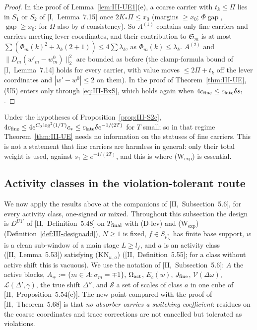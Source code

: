 \documentclass[10pt]{amsart}
\theoremstyle{definition}
\theoremstyle{remark}
\newcommand{\gap}{\operatorname{gap}}
\begin{document}
\begin{proof}
In the proof of Lemma~\ref{lem:III-UE1}(e), a coarse carrier with $t_k\le\Pi$ lies
in $S_1$ or $S_2$ of [I,~Lemma~7.15] once $2K_*\Pi\le x_0$ (margins $\ge x_0$;
$\Phi\gap$, $\gap\ge x_0$; for $\Omega$ also by $d$-consistency).  So
$A^{(1)}$ contains only fine carriers and carriers meeting lever coordinates, and
their contribution to $\mathfrak S_m$ is at most $\sum(\Phi_m(k)^2+\lambda_k(2+1))
\le4\sum\lambda_k$, as $\Phi_m(k)\le\lambda_k$.  $A^{(2)}$ and
$\|D_m(w'_m-w^0_m)\|_2^2$ are bounded as before (the clamp-formula bound of
[I,~Lemma~7.14] holds for every carrier, with value moves $\le2\Pi+t_k$ off the
lever coordinates and $|w'-w^0|\le2$ on them).  In the proof of
Theorem~\ref{thm:III-UE}, (U5) enters only through \eqref{eq:III-BxS}, which
holds again when $4c_{\rm fine}\le c_{\rm late}\delta s_1$.
\end{proof}

Under the hypotheses of Proposition~\ref{prop:III-S2c}, $4c_{\rm fine}\le
4e^{C_0\log^2(1/T)}c_*\le c_{\rm late}\delta e^{-1/(2T)}$ for $T$ small; so in that regime
Theorem~\ref{thm:III-UE} needs no information on the statuses of fine carriers.
This is not a statement that fine carriers are harmless in general: only their
total weight is used, against $s_1\ge e^{-1/(2T)}$, and this is where
(W$_{\exp}$) is essential.

\subsection{Activity classes in the violation-tolerant route}\label{subsec:III-mixed}

We now apply the results above at the companions of [II,~Subsection~5.6], for
every activity class, one-signed or mixed.  Throughout this subsection the
design is $D^{U1'}$ of [II,~Definition~5.48] on $T_{\rm final}$ with (D-lev) and
(W$_{\exp}$) (Definition~\ref{def:III-designadd}), $N\ge1$ is fixed, $f\in
S_{p_N^*}$ has finite base support, $w$ is a clean sub-window of a main stage
$L\ge l_f$, and $a$ is an activity class ([II,~Lemma~5.53]) satisfying
(KN$_{w,a}$) ([II,~Definition~5.55]; for a class without active shift this is
vacuous).  We use the notation of [II,~Subsection~5.6]: $A$ the active blocks,
$A_\mp:=\{m\in A:\sigma_m=\mp1\}$, $\Omega_{\rm act}$, $E_c(w)$, $J_{\rm fine}$,
$\mathcal V(\Delta\omega)$, $\mathcal L(\Delta',\gamma)$, the true shift $\Delta''$,
and $\mathcal S$ a set of scales of class $a$ in one cube of
[II,~Proposition~5.54(c)].  The new point compared with the proof of [II,~Theorem~5.68] is
that \emph{no absorber carries a switching coefficient}: residues on the coarse
coordinates and trace corrections are not cancelled but tolerated as violations.
\end{document}
